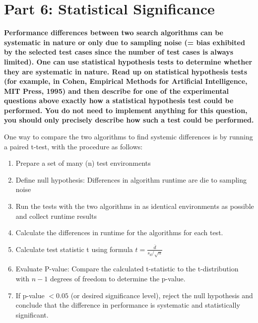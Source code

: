 \documentclass[12pt]{article}
\begin{document}
\section{Part 6: Statistical Significance\\}
\textbf{Performance differences between two search algorithms can be systematic in nature or only due to sampling noise (= bias exhibited by the selected test cases since the number of test cases is always
limited). One can use statistical hypothesis tests to determine whether they are systematic in nature. Read up on statistical hypothesis tests (for example, in Cohen, Empirical Methods for Artificial Intelligence, MIT Press, 1995) and then describe for one of the experimental questions above exactly how a statistical hypothesis test could be performed. You do not need
to implement anything for this question, you should only precisely describe how such a test could be performed.\\}

One way to compare the two algorithms to find systemic differences is by running a paired t-test, with the procedure as follows:
\begin{enumerate}
    \item Prepare a set of many (n) test environments
    \item Define null hypothesis: Differences in algorithm runtime are die to sampling noise
    \item Run the tests with the two algorithms in as identical environments as possible and collect runtime results
    \item Calculate the differences in runtime for the algorithms for each test.
    \item Calculate test statistic t using formula $t = \frac{\bar{d}}{s_d / \sqrt{n}}$
    \item Evaluate P-value: Compare the calculated t-statistic to the t-distribution with $n-1$ degrees of freedom to determine the p-value.
    \item If p-value $<0.05$ (or desired significance level), reject the null hypothesis and conclude that the difference in performance is systematic and statistically significant.
\end{enumerate}
\end{document}
